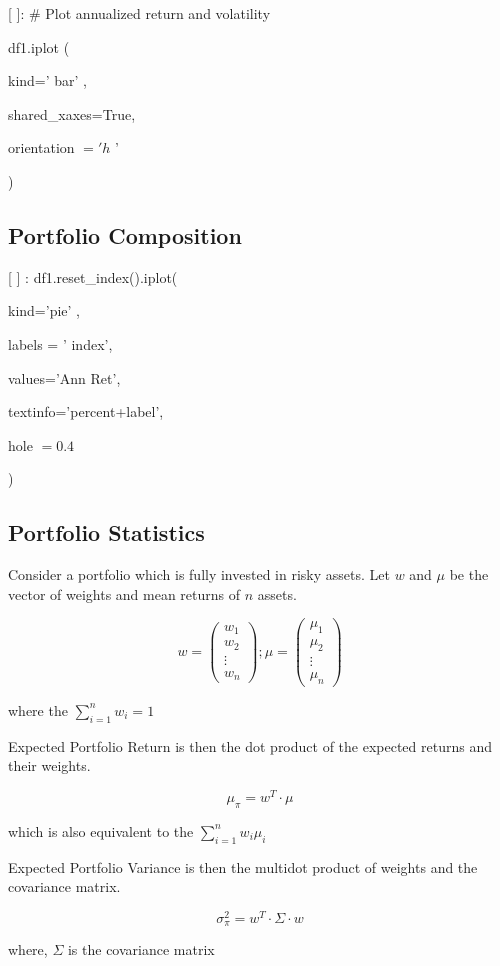 \documentclass[10pt]{article}
\begin{document}
[ ]: \# Plot annualized return and volatility

df1.iplot (

kind=' bar' ,

shared\_xaxes=True,

orientation $=' h$ '

)

\subsection*{Portfolio Composition}
[ ] : df1.reset\_index().iplot(

kind='pie' ,

labels = ' index',

values='Ann Ret',

textinfo='percent+label',

hole $=0.4$

)

\subsection*{Portfolio Statistics}
Consider a portfolio which is fully invested in risky assets. Let $w$ and $\mu$ be the vector of weights and mean returns of $n$ assets.

$$
w=\left(\begin{array}{c}
w_{1} \\
w_{2} \\
\vdots \\
w_{n}
\end{array}\right) ; \mu=\left(\begin{array}{c}
\mu_{1} \\
\mu_{2} \\
\vdots \\
\mu_{n}
\end{array}\right)
$$

where the $\sum_{i=1}^{n} w_{i}=1$

Expected Portfolio Return is then the dot product of the expected returns and their weights.

$$
\mu_{\pi}=w^{T} \cdot \mu
$$

which is also equivalent to the $\sum_{i=1}^{n} w_{i} \mu_{i}$

Expected Portfolio Variance is then the multidot product of weights and the covariance matrix.

$$
\sigma_{\pi}^{2}=w^{T} \cdot \Sigma \cdot w
$$

where, $\Sigma$ is the covariance matrix
\end{document}
